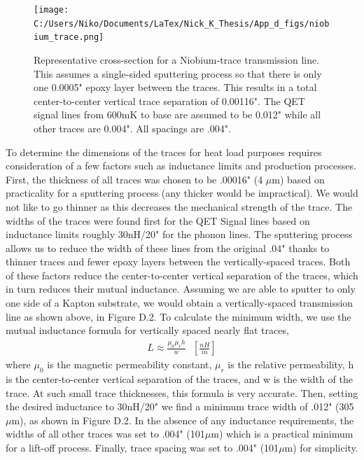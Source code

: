\documentclass{report}
\begin{document}
\begin{appendices}
\begin{figure}[h]
\centering
\texttt{[image: C:/Users/Niko/Documents/LaTex/Nick\_K\_Thesis/App\_d\_figs/niobium\_trace.png]}
\caption{Representative cross-section for a Niobium-trace transmission line. This assumes a single-sided sputtering process so that there is only one 0.0005" epoxy layer between the traces. This results in a total center-to-center vertical trace separation of 0.00116". The QET signal lines from 600mK to base are assumed to be 0.012" while all other traces are 0.004". All spacings are .004".}
\end{figure}

To determine the dimensions of the traces for heat load purposes requires consideration of a few factors such as inductance limits and production processes. First, the thickness of all traces was chosen to be .00016" (4 $\mu$m) based on practicality for a sputtering process (any thicker would be impractical). We would not like to go thinner as this decreases the mechanical strength of the trace. The widths of the traces were found first for the QET Signal lines based on inductance limits roughly 30nH/20" for the phonon lines. The sputtering process allows us to reduce the width of these lines from the original .04" thanks to thinner traces and fewer epoxy layers between the vertically-spaced traces. Both of these factors reduce the center-to-center vertical separation of the traces, which in turn reduces their mutual inductance. Assuming we are able to sputter to only one side of a Kapton substrate, we would obtain a vertically-spaced transmission line as shown above, in Figure D.2. To calculate the minimum width, we use the mutual inductance formula for vertically spaced nearly flat traces,
\begin{eqnarray}
L \approx \frac{\mu_0 \mu_r h}{w} \ \ \ \left[\frac{nH}{in}\right]
\end{eqnarray}
where $\mu_0$ is the magnetic permeability constant, $\mu_r$ is the relative permeability, h is the center-to-center vertical separation of the traces, and w is the width of the trace. At such small trace thicknesses, this formula is very accurate. Then, setting the desired inductance to 30nH/20" we find a minimum trace width of .012" (305$\mu$m), as shown in Figure D.2. In the absence of any inductance requirements, the widths of all other traces was set to .004" (101$\mu$m) which is a practical minimum for a lift-off process. Finally, trace spacing was set to .004" (101$\mu$m) for simplicity.


\end{appendices}
\end{document}
